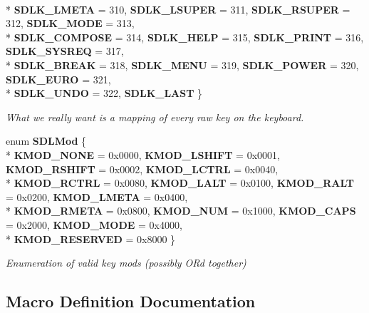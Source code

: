 \begin{DoxyCompactItemize}
\\*
{\bf S\+D\+L\+K\+\_\+\+L\+M\+E\+T\+A} = 310, 
{\bf S\+D\+L\+K\+\_\+\+L\+S\+U\+P\+E\+R} = 311, 
{\bf S\+D\+L\+K\+\_\+\+R\+S\+U\+P\+E\+R} = 312, 
{\bf S\+D\+L\+K\+\_\+\+M\+O\+D\+E} = 313, 
\\*
{\bf S\+D\+L\+K\+\_\+\+C\+O\+M\+P\+O\+S\+E} = 314, 
{\bf S\+D\+L\+K\+\_\+\+H\+E\+L\+P} = 315, 
{\bf S\+D\+L\+K\+\_\+\+P\+R\+I\+N\+T} = 316, 
{\bf S\+D\+L\+K\+\_\+\+S\+Y\+S\+R\+E\+Q} = 317, 
\\*
{\bf S\+D\+L\+K\+\_\+\+B\+R\+E\+A\+K} = 318, 
{\bf S\+D\+L\+K\+\_\+\+M\+E\+N\+U} = 319, 
{\bf S\+D\+L\+K\+\_\+\+P\+O\+W\+E\+R} = 320, 
{\bf S\+D\+L\+K\+\_\+\+E\+U\+R\+O} = 321, 
\\*
{\bf S\+D\+L\+K\+\_\+\+U\+N\+D\+O} = 322, 
{\bf S\+D\+L\+K\+\_\+\+L\+A\+S\+T}
 \}
\begin{DoxyCompactList}\small\item\em What we really want is a mapping of every raw key on the keyboard. \end{DoxyCompactList}\item 
enum {\bf S\+D\+L\+Mod} \{ \\*
{\bf K\+M\+O\+D\+\_\+\+N\+O\+N\+E} = 0x0000, 
{\bf K\+M\+O\+D\+\_\+\+L\+S\+H\+I\+F\+T} = 0x0001, 
{\bf K\+M\+O\+D\+\_\+\+R\+S\+H\+I\+F\+T} = 0x0002, 
{\bf K\+M\+O\+D\+\_\+\+L\+C\+T\+R\+L} = 0x0040, 
\\*
{\bf K\+M\+O\+D\+\_\+\+R\+C\+T\+R\+L} = 0x0080, 
{\bf K\+M\+O\+D\+\_\+\+L\+A\+L\+T} = 0x0100, 
{\bf K\+M\+O\+D\+\_\+\+R\+A\+L\+T} = 0x0200, 
{\bf K\+M\+O\+D\+\_\+\+L\+M\+E\+T\+A} = 0x0400, 
\\*
{\bf K\+M\+O\+D\+\_\+\+R\+M\+E\+T\+A} = 0x0800, 
{\bf K\+M\+O\+D\+\_\+\+N\+U\+M} = 0x1000, 
{\bf K\+M\+O\+D\+\_\+\+C\+A\+P\+S} = 0x2000, 
{\bf K\+M\+O\+D\+\_\+\+M\+O\+D\+E} = 0x4000, 
\\*
{\bf K\+M\+O\+D\+\_\+\+R\+E\+S\+E\+R\+V\+E\+D} = 0x8000
 \}
\begin{DoxyCompactList}\small\item\em Enumeration of valid key mods (possibly O\+R\textquotesingle{}d together) \end{DoxyCompactList}\end{DoxyCompactItemize}


\subsection{Macro Definition Documentation}
